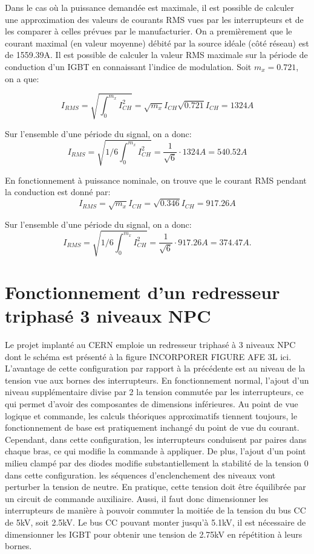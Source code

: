 Dans le cas où la puissance demandée est maximale, il est possible de calculer une approximation des valeurs de courants RMS vues par les interrupteurs et de les comparer à celles prévues par le manufacturier. On a premièrement que le courant maximal (en valeur moyenne) débité par la source idéale (côté réseau) est de 1559.39A. Il est possible de calculer la valeur RMS maximale sur la période de conduction d'un IGBT en connaissant l'indice de modulation. Soit $m_x = 0.721$, on a que:

\begin{equation}
I_{RMS} = \sqrt{\int_0^{m_x} I_{CH}^2} = \sqrt{m_x}I_{CH}  \sqrt{0.721}I_{CH}= 1324A
\end{equation}

Sur l'ensemble d'une période du signal, on a donc:
\begin{equation}
I_{RMS} =  \sqrt{1/6\int_0^{m_x} I_{CH}^2} = \frac{1}{\sqrt{6}}\cdot 1324A = 540.52A
\end{equation}

En fonctionnement à puissance nominale, on trouve que le courant RMS pendant la conduction est donné par:
\begin{equation}
I_{RMS} =  \sqrt{m_x}I_{CH} = \sqrt{0.346}I_{CH} = 917.26A
\end{equation}

Sur l'ensemble d'une période du signal, on a donc:
\begin{equation}
I_{RMS} =  \sqrt{1/6\int_0^{m_x} I_{CH}^2} = \frac{1}{\sqrt{6}}\cdot 917.26A = 374.47A.
\end{equation}
\section{Fonctionnement d'un redresseur triphasé 3 niveaux NPC}
Le projet implanté au CERN emploie un redresseur triphasé à 3 niveaux NPC dont le schéma est présenté à la figure INCORPORER FIGURE AFE 3L ici. L'avantage de cette configuration par rapport à la précédente est au niveau de la tension vue aux bornes des interrupteurs. En fonctionnement normal, l'ajout d'un niveau supplémentaire divise par 2 la tension commutée par les interrupteurs, ce qui permet d'avoir des composantes de dimensions inférieures. Au point de vue logique et commande, les calculs théoriques approximatifs tiennent toujours, le fonctionnement  de base est pratiquement inchangé du point de vue du courant. Cependant, dans cette configuration, les interrupteurs conduisent par paires dans chaque bras, ce qui modifie la commande à appliquer. De plus, l'ajout d'un point milieu \og clampé \fg{} par des diodes modifie substantiellement la stabilité de la tension 0 dans cette configuration. les séquences d'enclenchement des niveaux vont perturber la tension de neutre. En pratique, cette tension doit être équilibrée par un circuit de commande auxiliaire. Aussi, il faut donc dimensionner les interrupteurs de manière à pouvoir commuter la moitiée de la tension du bus CC de  5kV, soit 2.5kV. Le bus CC pouvant monter jusqu'à 5.1kV, il est nécessaire de dimensionner les IGBT pour obtenir une tension de 2.75kV en répétition à leurs bornes.